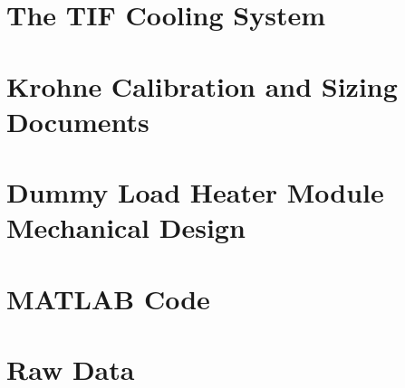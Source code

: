\documentclass{report}
\begin{document}
\chapter{The TIF Cooling System}\label{app:TIF}


\chapter{Krohne Calibration and Sizing Documents}




\chapter{Dummy Load Heater Module Mechanical Design}



\chapter{MATLAB Code}
\chapter{Raw Data}
\end{document}
